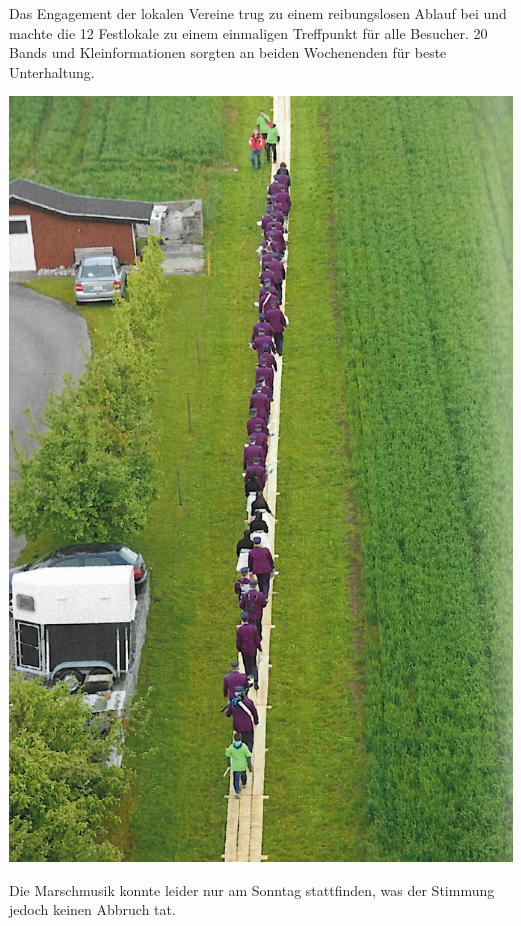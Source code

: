 \begin{history}
    Das Engagement der lokalen Vereine trug zu einem reibungslosen Ablauf bei
    und machte die 12 Festlokale zu einem einmaligen Treffpunkt für alle
    Besucher. 20 Bands und Kleinformationen sorgten an beiden Wochenenden für
    beste Unterhaltung.

    \begin{MulticolFigure}
        \centering
        \includegraphics[width=0.7\linewidth]{./chap/2001-2024/2013/Unterwegs-zum-Start.jpg}
    \end{MulticolFigure}


    Die Marschmusik konnte leider nur am Sonntag stattfinden, was der Stimmung
    jedoch keinen Abbruch tat.


\end{history}
